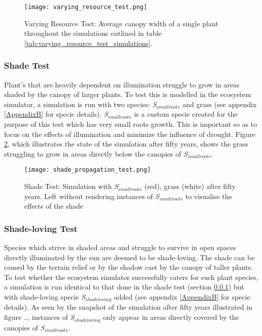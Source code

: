 \begin{figure}
\center
	\texttt{[image: varying\_resource\_test.png]}
	\caption{ Varying Resource Test: Average canopy width of a single plant throughout the simulations outlined in table \ref{tab:varying_resource_test_simulations}. }
	\label{fig:varying_resource_test}
\end{figure}

\subsubsection{Shade Test} \label{subsubsec:shade_test}

Plant's that are heavily dependent on illumination struggle to grow in areas shaded by the canopy of larger plants. To test this is modelled in the ecosystem simulator, a simulation is run with two species: \textit{S$_{smallroots}$} and grass (see appendix \ref{AppendixB} for specie details).  \textit{S$_{smallroots}$} is a custom specie created for the purpose of this test which has very small roots growth. This is important so as to focus on the effects of illumination and minimize the influence of drought. Figure \ref{fig:shade_test}, which illustrates the state of the simulation after fifty years, shows the grass struggling to grow in areas directly below the canopies of \textit{S$_{smallroots}$}.

\begin{figure}
\center
	\texttt{[image: shade\_propagation\_test.png]}
	\caption{ Shade Test: Simulation with \textit{S$_{smallroots}$} (red), grass (white) after fifty years. Left without rendering instances of \textit{S$_{smallroots}$} to visualise the effects of the shade}
	\label{fig:shade_test}
\end{figure}

\subsubsection{Shade-loving Test} \label{subsubsec:shade_loving_test}

Species which strive in shaded areas and struggle to survive in open spaces directly illuminated by the sun are deemed to be shade-loving. The shade can be caused by the terrain relief or by the shadow cast by the canopy of taller plants. To test whether the ecosystem simulator successfully caters for such plant species, a simulation is run identical to that done in the shade test (section \ref{subsubsec:shade_test}) but with shade-loving specie \textit{S$_{shadeloving}$} added (see appendix \ref{AppendixB} for specie details). As seen by the snapshot of the simulation after fifty years illustrated in figure .., instances of \textit{S$_{shadeloving}$} only appear in areas directly covered by the canopies of \textit{S$_{smallroots}$}.


